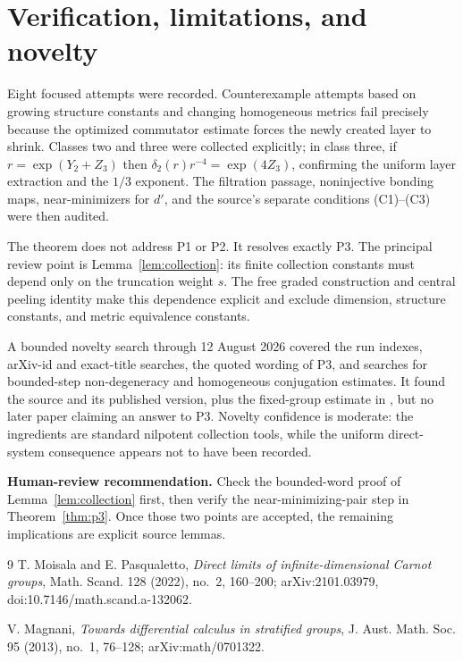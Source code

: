 \documentclass[10pt]{article}
\begin{document}
\section*{Verification, limitations, and novelty}

Eight focused attempts were recorded.  Counterexample attempts based on
growing structure constants and changing homogeneous metrics fail precisely
because the optimized commutator estimate forces the newly created layer to
shrink.  Classes two and three were collected explicitly; in class three, if
$r=\exp(Y_2+Z_3)$ then
$\delta_2(r)r^{-4}=\exp(4Z_3)$, confirming the uniform layer extraction and
the $1/3$ exponent.  The filtration passage, noninjective bonding maps,
near-minimizers for $d'$, and the source's separate conditions (C1)--(C3) were
then audited.

The theorem does not address P1 or P2.  It resolves exactly P3.  The principal
review point is Lemma~\ref{lem:collection}: its finite collection constants
must depend only on the truncation weight $s$.  The free graded construction
and central peeling identity make this dependence explicit and exclude
dimension, structure constants, and metric equivalence constants.

A bounded novelty search through 12 August 2026 covered the run indexes,
arXiv-id and exact-title searches, the quoted wording of P3, and searches for
bounded-step non-degeneracy and homogeneous conjugation estimates.  It found
the source and its published version, plus the fixed-group estimate in
\cite{Mag}, but no later paper claiming an answer to P3.  Novelty confidence is
moderate: the ingredients are standard nilpotent collection tools, while the
uniform direct-system consequence appears not to have been recorded.

\textbf{Human-review recommendation.} Check the bounded-word proof of
Lemma~\ref{lem:collection} first, then verify the near-minimizing-pair step in
Theorem~\ref{thm:p3}.  Once those two points are accepted, the remaining
implications are explicit source lemmas.

\begin{thebibliography}{9}
T. Moisala and E. Pasqualetto,
\emph{Direct limits of infinite-dimensional Carnot groups},
Math. Scand. 128 (2022), no.~2, 160--200;
arXiv:2101.03979, doi:10.7146/math.scand.a-132062.

V. Magnani,
\emph{Towards differential calculus in stratified groups},
J. Aust. Math. Soc. 95 (2013), no.~1, 76--128;
arXiv:math/0701322.
\end{thebibliography}
\end{document}
